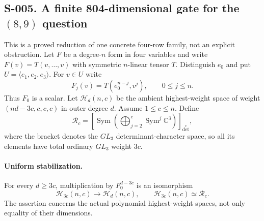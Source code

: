 \subsection{S-005. A finite 804-dimensional gate for the $(8,9)$ question}
This is a proved reduction of one concrete four-row family, not an
explicit obstruction. Let $F$ be a degree-$n$ form in four variables and
write $F(v)=T(v,\ldots,v)$ with symmetric $n$-linear tensor $T$.
Distinguish $e_0$ and put $U=\langle e_1,e_2,e_3\rangle$. For $v\in U$
write
\[
 F_j(v)=T(e_0^{n-j},v^j),\qquad 0\leq j\leq n.
\]
Thus $F_0$ is a scalar. Let $\mathcal H_d(n,c)$ be the ambient
highest-weight space of weight $(nd-3c,c,c,c)$ in outer degree $d$.
Assume $1\leq c\leq n$. Define
\[
 \mathcal R_c=
 \left[\operatorname{Sym}\left(\bigoplus_{j=2}^c
                        \operatorname{Sym}^j\mathbb C^3\right)\right]_{\det^c},
\]
where the bracket denotes the $GL_3$ determinant-character space, so
all its elements have total ordinary $GL_3$ weight $3c$.

\paragraph{Uniform stabilization.}
For every $d\geq3c$, multiplication by $F_0^{d-3c}$ is an isomorphism
\[
             \mathcal H_{3c}(n,c)\longrightarrow\mathcal H_d(n,c),
             \qquad\mathcal H_{3c}(n,c)\simeq\mathcal R_c.
\]
The assertion concerns the actual polynomial highest-weight spaces,
not only equality of their dimensions.

